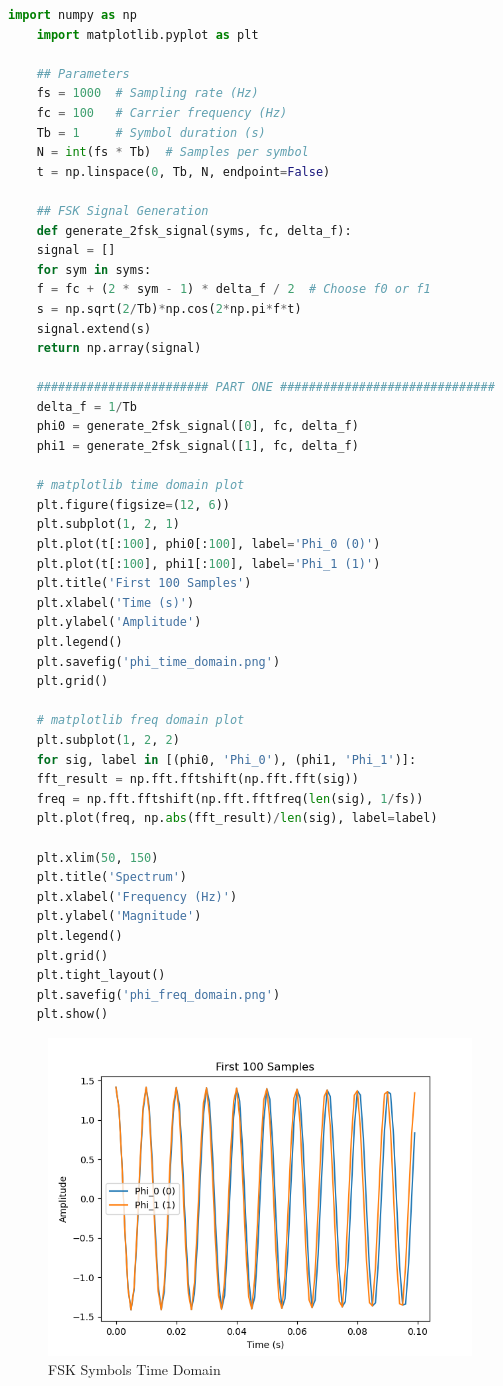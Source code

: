 \documentclass[
	letterpaper, %
	10pt, %
]{CSUniSchoolLabReport}
\begin{document}
\begin{lstlisting}[language=Python]
	import numpy as np
	import matplotlib.pyplot as plt
	
	## Parameters
	fs = 1000  # Sampling rate (Hz)
	fc = 100   # Carrier frequency (Hz)
	Tb = 1     # Symbol duration (s)
	N = int(fs * Tb)  # Samples per symbol
	t = np.linspace(0, Tb, N, endpoint=False)
	
	## FSK Signal Generation
	def generate_2fsk_signal(syms, fc, delta_f):
	signal = []
	for sym in syms:
	f = fc + (2 * sym - 1) * delta_f / 2  # Choose f0 or f1
	s = np.sqrt(2/Tb)*np.cos(2*np.pi*f*t)
	signal.extend(s)
	return np.array(signal)
	
	######################## PART ONE ##############################
	delta_f = 1/Tb
	phi0 = generate_2fsk_signal([0], fc, delta_f)
	phi1 = generate_2fsk_signal([1], fc, delta_f)
	
	# matplotlib time domain plot
	plt.figure(figsize=(12, 6))
	plt.subplot(1, 2, 1)
	plt.plot(t[:100], phi0[:100], label='Phi_0 (0)')
	plt.plot(t[:100], phi1[:100], label='Phi_1 (1)')
	plt.title('First 100 Samples')
	plt.xlabel('Time (s)')
	plt.ylabel('Amplitude')
	plt.legend()
	plt.savefig('phi_time_domain.png')
	plt.grid()
	
	# matplotlib freq domain plot
	plt.subplot(1, 2, 2)
	for sig, label in [(phi0, 'Phi_0'), (phi1, 'Phi_1')]:
	fft_result = np.fft.fftshift(np.fft.fft(sig))
	freq = np.fft.fftshift(np.fft.fftfreq(len(sig), 1/fs))
	plt.plot(freq, np.abs(fft_result)/len(sig), label=label)
	
	plt.xlim(50, 150)
	plt.title('Spectrum')
	plt.xlabel('Frequency (Hz)')
	plt.ylabel('Magnitude')
	plt.legend()
	plt.grid()
	plt.tight_layout()
	plt.savefig('phi_freq_domain.png')
	plt.show()
\end{lstlisting}

\begin{figure}[H] %
	\centering %
	\includegraphics[width=1.2\textwidth]{phi_time_domain.png} %
	\caption{FSK Symbols Time Domain}
	\label{fig:block}
\end{figure}
\end{document}
